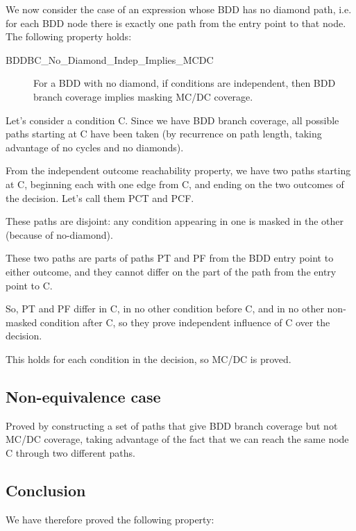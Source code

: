 \documentclass[a4paper,12pt,twoside]{article}
\begin{document}
We now consider the case of an expression whose BDD has no diamond path,
i.e. for each BDD node there is exactly one path from the entry point to
that node. The following property holds:

\begin{description}
\item[BDDBC\_No\_Diamond\_Indep\_Implies\_MCDC]
  For a BDD with no diamond, if conditions are independent, then
  BDD branch coverage implies masking MC/DC coverage.
\end{description}

Let's consider a condition C. Since we have BDD branch coverage,
all possible paths starting at C have been taken (by recurrence on path
length, taking advantage of no cycles and no diamonds).

From the independent outcome reachability property, we have two paths
starting at C, beginning each with one edge from C, and ending on the
two outcomes of the decision. Let's call them PCT and PCF.

These paths are disjoint: any condition appearing in one is masked
in the other (because of no-diamond).

These two paths are parts of paths PT and PF from the BDD entry point to
either outcome, and they cannot differ on the part of the path from the
entry point to C.

So, PT and PF differ in C, in no other condition before C, and in no
other non-masked condition after C, so they prove independent influence
of C over the decision.

This holds for each condition in the decision, so MC/DC is proved.

\subsection{Non-equivalence case}

Proved by constructing a set of paths that give BDD branch coverage but
not MC/DC coverage, taking advantage of the fact that we can reach the
same node C through two different paths.


\subsection{Conclusion}

We have therefore proved the following property:
\end{document}
